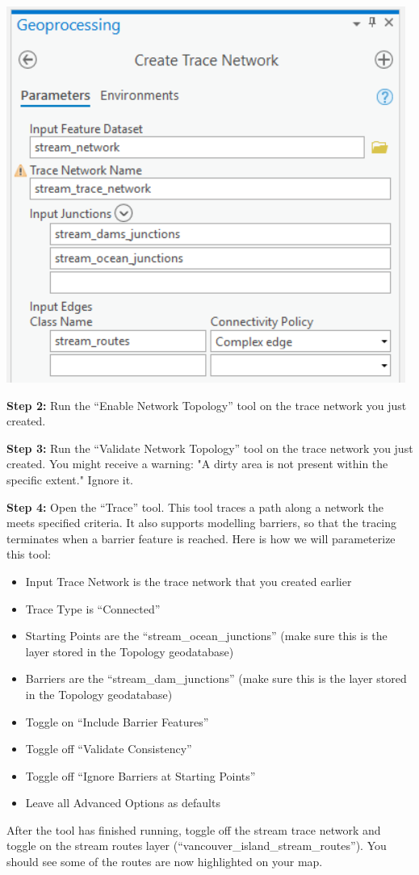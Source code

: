 \documentclass[
]{book}
\begin{document}
\includegraphics[width=0.5\linewidth]{images/02-create-trace-network}

\textbf{Step 2:} Run the ``Enable Network Topology'' tool on the trace network you just created.

\textbf{Step 3:} Run the ``Validate Network Topology'' tool on the trace network you just created. You might receive a warning: "A dirty area is not present within the specific extent." Ignore it.

\textbf{Step 4:} Open the ``Trace'' tool. This tool traces a path along a network the meets specified criteria. It also supports modelling barriers, so that the tracing terminates when a barrier feature is reached. Here is how we will parameterize this tool:

\begin{itemize}
\item
  Input Trace Network is the trace network that you created earlier
\item
  Trace Type is ``Connected''
\item
  Starting Points are the ``stream\_ocean\_junctions'' (make sure this is the layer stored in the Topology geodatabase)
\item
  Barriers are the ``stream\_dam\_junctions'' (make sure this is the layer stored in the Topology geodatabase)
\item
  Toggle on ``Include Barrier Features''
\item
  Toggle off ``Validate Consistency''
\item
  Toggle off ``Ignore Barriers at Starting Points''
\item
  Leave all Advanced Options as defaults
\end{itemize}

After the tool has finished running, toggle off the stream trace network and toggle on the stream routes layer (``vancouver\_island\_stream\_routes''). You should see some of the routes are now highlighted on your map.
\end{document}
